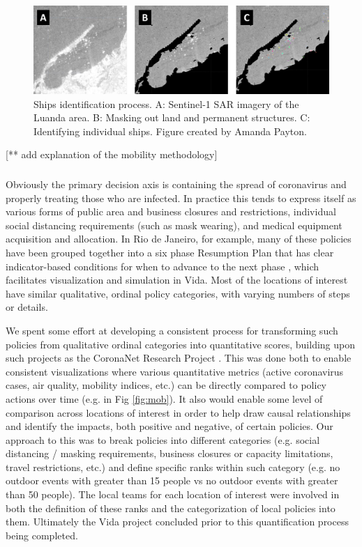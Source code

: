 \begin{figure}[h]
	\centering
	\includegraphics[scale=0.35]{Figures/chap5/ships.pdf}
	\caption[Ships identification process]{Ships identification process. A: Sentinel-1 SAR imagery of the Luanda area. B: Masking out land and permanent structures. C: Identifying individual ships. Figure created by Amanda Payton.}
	\label{fig:ships}
\end{figure}

[** add explanation of the mobility methodology]


\subsubsection{}

Obviously the primary decision axis is containing the spread of coronavirus and properly treating those who are infected. In practice this tends to express itself as various forms of public area and business closures and restrictions, individual social distancing requirements (such as mask wearing), and medical equipment acquisition and allocation. In Rio de Janeiro, for example, many of these policies have been grouped together into a six phase Resumption Plan that has clear indicator-based conditions for when to advance to the next phase \cite{iplanrioIndicadoresPlanoRetomada2020}, which facilitates visualization and simulation in Vida. Most of the locations of interest have similar qualitative, ordinal policy categories, with varying numbers of steps or details. 

We spent some effort at developing a consistent process for transforming such policies from qualitative ordinal categories into quantitative scores, building upon such projects as the CoronaNet Research Project \cite{CoronaNetResearchProject}. This was done both to enable consistent visualizations where various quantitative metrics (active coronavirus cases, air quality, mobility indices, etc.) can be directly compared to policy actions over time (e.g. in Fig \ref{fig:mob}). It also would enable some level of comparison across locations of interest in order to help draw causal relationships and identify the impacts, both positive and negative, of certain policies. Our approach to this was to break policies into different categories (e.g. social distancing / masking requirements, business closures or capacity limitations, travel restrictions, etc.) and define specific ranks within such category (e.g. no outdoor events with greater than 15 people vs no outdoor events with greater than 50 people). The local teams for each location of interest were involved in both the definition of these ranks and the categorization of local policies into them. Ultimately the Vida project concluded prior to this quantification process being completed.  

